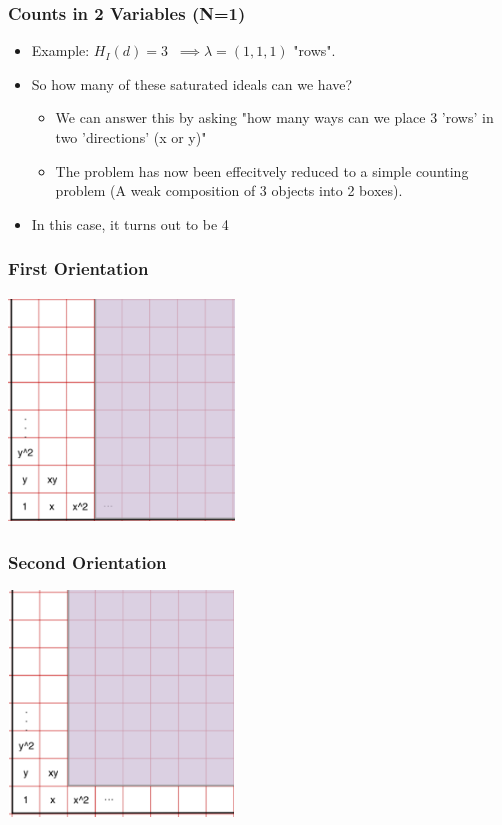 \documentclass{beamer}
\begin{document}
\begin{frame}
	\frametitle{Counts in 2 Variables (N=1)}
	\begin{itemize}
	\item Example: $H_I(d)=3 \;\; \implies \lambda = (1,1,1) $ \; "rows".
	\item So how many of these saturated ideals can we have?
	\begin{itemize}
		\item We can answer this by asking "how many ways can we place 3 'rows' in two 'directions' (x or y)"
		\item The problem has now been effecitvely reduced to a simple counting problem (A weak composition of 3 objects into 2 boxes).
	\end{itemize}
	\item In this case, it turns out to be 4 

	\end{itemize}
\end{frame}


\begin{frame}
	\frametitle{First Orientation}
	\begin{center}
	\includegraphics[width=6cm, height=6cm]{LogMMidtermPresentationImages/hpis3firstorientation.png}
	\end{center}
\end{frame}

\begin{frame}
	\frametitle{Second Orientation}
	\begin{center}
		\includegraphics[width=6cm, height=6cm]{LogMMidtermPresentationImages/hpis3secondorientation.png}
	\end{center}
\end{frame}
\end{document}
